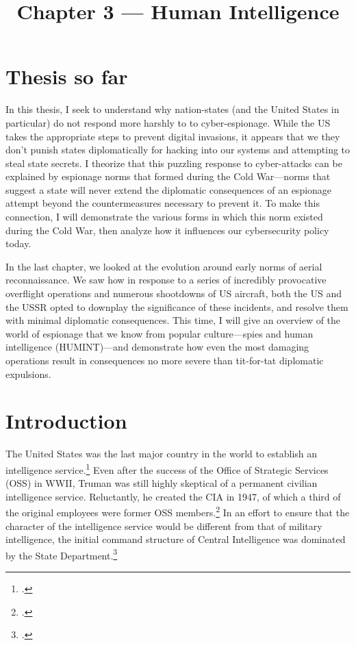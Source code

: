 \documentclass[12pt]{article}
\title{Chapter 3 --- Human Intelligence}
\date{}
\author{}
\begin{document}
\maketitle


\section*{Thesis so far}
\begin{em}
In this thesis, I seek to understand why nation-states (and the United States in particular) do not respond more harshly to to cyber-espionage. While the US takes the appropriate steps to prevent digital invasions, it appears that we they don't punish states diplomatically for hacking into our systems and attempting to steal state secrets. I theorize that this puzzling response to cyber-attacks can be explained by espionage norms that formed during the Cold War---norms that suggest a state will never extend the diplomatic consequences of an espionage attempt beyond the countermeasures necessary to prevent it. To make this connection, I will demonstrate the various forms in which this norm existed during the Cold War, then analyze how it influences our cybersecurity policy today.

In the last chapter, we looked at the evolution around early norms of aerial reconnaissance. We saw how in response to a series of incredibly provocative overflight operations and numerous shootdowns of US aircraft, both the US and the USSR opted to downplay the significance of these incidents, and resolve them with minimal diplomatic consequences. This time, I will give an overview of the world of espionage that we know from popular culture---spies and human intelligence (HUMINT)---and demonstrate how even the most damaging operations result in consequences no more severe than tit-for-tat diplomatic expulsions.
\end{em}

\section{Introduction}
The United States was the last major country in the world to establish an intelligence service.\footcite[p.~35]{olson_fair_2006} Even after the success of the Office of Strategic Services (OSS) in WWII, Truman was still highly skeptical of a permanent civilian intelligence service. Reluctantly, he created the CIA in 1947, of which a third of the original employees were former OSS members.\footcite[p.~37]{olson_fair_2006} In an effort to ensure that the character of the intelligence service would be different from that of military intelligence, the initial command structure of Central Intelligence was dominated by the State Department.\footcite{troy_truman_1993}
\end{document}
